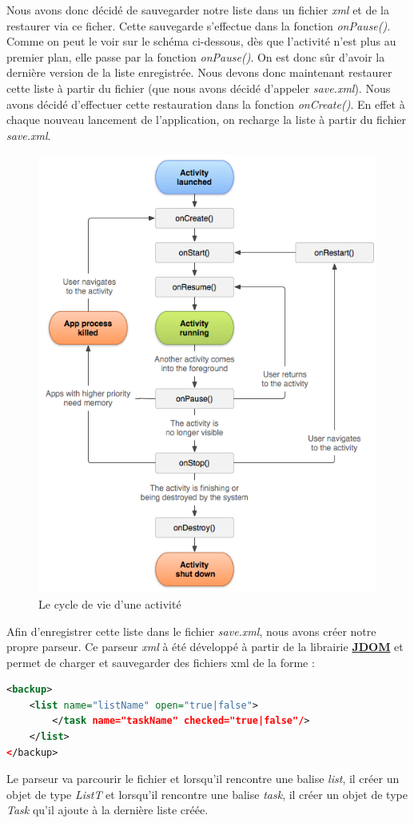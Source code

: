\documentclass[a4paper,10pt]{article}
\begin{document}
Nous avons donc décidé de sauvegarder notre liste dans un fichier \emph{xml} et de la restaurer via ce ficher. Cette sauvegarde s'effectue dans la fonction \emph{onPause()}. Comme on peut le voir sur le schéma ci-dessous, dès que l'activité n'est plus au premier plan, elle passe par la fonction \emph{onPause()}. On est donc sûr d'avoir la dernière version de la liste enregistrée.
Nous devons donc maintenant restaurer cette liste à partir du fichier (que nous avons décidé d'appeler \textit{save.xml}). Nous avons décidé d'effectuer cette restauration dans la fonction \emph{onCreate()}. En effet à chaque nouveau lancement de l'application, on recharge la liste à partir du fichier \textit{save.xml}.
\begin{figure}[htpb]
	\center
	\includegraphics[scale=0.45]{Images/activity_lifecycle.png}
	\caption{Le cycle de vie d'une activité}
\end{figure}

Afin d'enregistrer cette liste dans le fichier \emph{save.xml}, nous avons créer notre propre parseur.
Ce parseur \emph{xml} à été développé à partir de la librairie \href{http://www.jdom.org/}{\textbf{JDOM}} et permet de charger et sauvegarder des fichiers xml
de la forme :
\begin{lstlisting}[language=XML]
<backup>
	<list name="listName" open="true|false">
		</task name="taskName" checked="true|false"/>
	</list>
</backup>
\end{lstlisting}
Le parseur va parcourir le fichier et lorsqu'il rencontre une balise \emph{list}, il créer un objet de type \emph{ListT} et lorsqu'il rencontre une balise
\emph{task}, il créer un objet de type \emph{Task} qu'il ajoute à la dernière liste créée.
\end{document}
